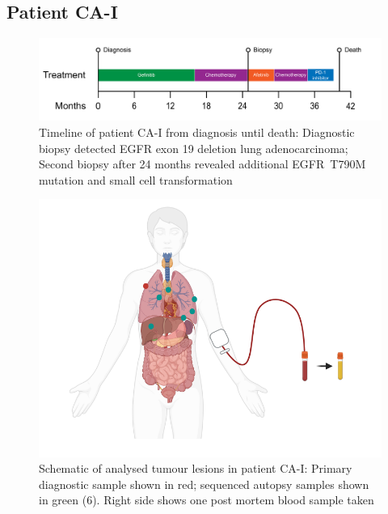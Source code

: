 \cleardoublepage

\subsection{Patient CA-I}
\label{cascade-sec:CA51}



\begin{figure}[!ht]
\centering
\includegraphics[width=.99\linewidth]{Figures/CA-I_timeline}
\caption[Timeline of patient CA-I from diagnosis until death]{Timeline of patient CA-I from diagnosis until death: Diagnostic biopsy detected EGFR exon 19 deletion lung adenocarcinoma; Second biopsy after 24 months revealed additional EGFR~T790M mutation and small cell transformation} \label{fig:ca51timeline}
\end{figure}



\begin{figure}[!ht]
\centering
\includegraphics[width=.99\linewidth]{Figures/CA-I_schematic_CA51}
\caption[Schematic of analysed tumour lesions in patient CA-I]{Schematic of analysed tumour lesions in patient CA-I: Primary diagnostic sample shown in red; sequenced autopsy samples shown in green (6). Right side shows one post mortem blood sample taken} \label{fig:cas51schematic}
\end{figure}


